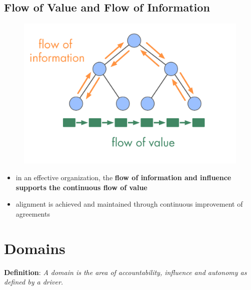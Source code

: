 \subsection{Flow of Value and Flow of Information}
\label{flowofvalueandflowofinformation}

\begin{figure}[htbp]
\centering
\includegraphics[keepaspectratio,width=\textwidth,height=0.75\textheight]{img/workflow-and-value/types-of-flow.png}
\end{figure}

\begin{itemize}
\item in an effective organization, the \textbf{flow of information and influence supports the continuous flow of value}

\item alignment is achieved and maintained through continuous improvement of agreements

\end{itemize}

\section{Domains}
\label{domains}

\textbf{Definition}: \emph{A domain is the area of accountability, influence and autonomy as defined by a driver.}

